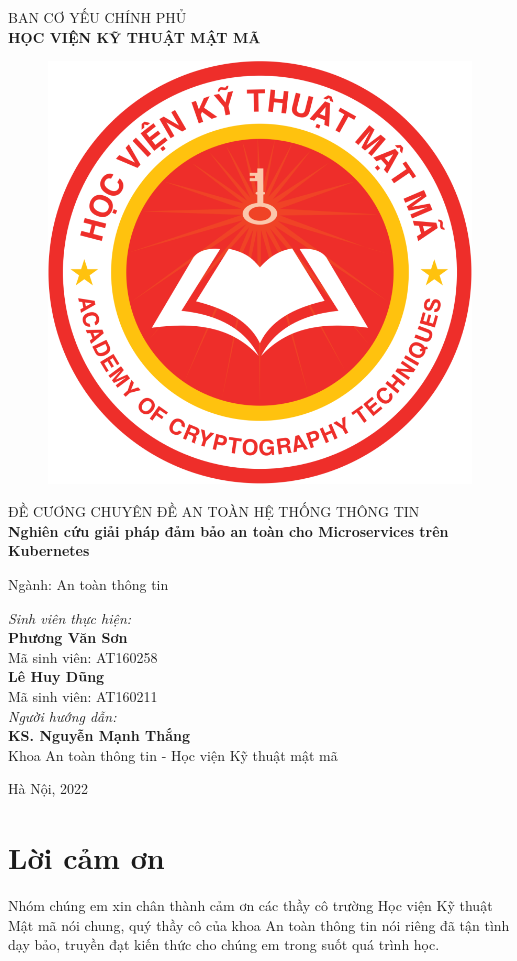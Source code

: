 \documentclass[12pt,a4paper]{report}
\author{LHD}
\author{LHD}
\begin{document}
	\begin{center}
		BAN CƠ YẾU CHÍNH PHỦ\\
		\textbf{HỌC VIỆN KỸ THUẬT MẬT MÃ}
	\end{center}
\begin{figure}[h]
	\centering
	\includegraphics[width=0.25\linewidth]{"Pics/Logo HV"}
	\label{fig:logo-hv}
\end{figure}

\begin{center}
	ĐỀ CƯƠNG CHUYÊN ĐỀ AN TOÀN HỆ THỐNG THÔNG TIN\\
	\textbf{Nghiên cứu giải pháp đảm bảo an toàn cho Microservices trên Kubernetes}
\end{center}
\bigskip
\begin{flushright}
	Ngành: An toàn thông tin
\end{flushright}
\vspace{30mm}
\begin{flushleft}
	\textit{Sinh viên thực hiện:}\\
	\textbf{Phương Văn Sơn}\\
	Mã sinh viên: AT160258\\
	\textbf{Lê Huy Dũng}\\
	Mã sinh viên: AT160211
	\bigskip\\
	\textit{Người hướng dẫn:}\\
	\textbf{KS. Nguyễn Mạnh Thắng}\\
	Khoa An toàn thông tin - Học viện Kỹ thuật mật mã
\end{flushleft}
\vfill
\begin{center}
	Hà Nội, 2022
\end{center}

	\tableofcontents
	
	\chapter*{\centering Lời cảm ơn}
	\hspace{1cm}Nhóm chúng em xin chân thành cảm ơn các thầy cô trường Học viện Kỹ thuật Mật mã nói chung, quý thầy cô của khoa An toàn thông tin nói riêng đã tận tình dạy bảo, truyền đạt kiến thức cho chúng em trong suốt quá trình học.\newline
	
\end{document}
